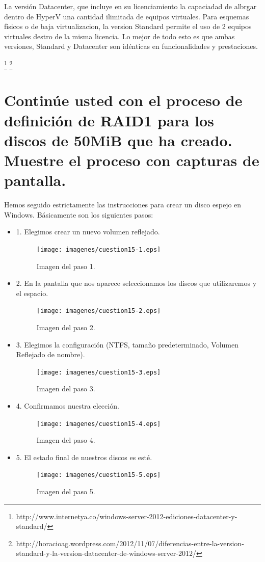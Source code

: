 La versión Datacenter, que incluye en su licenciamiento la capaciadad de albrgar dentro de HyperV una cantidad ilimitada de equipos virtuales. Para esquemas físicos o de baja virtualizacion, la version Standard permite el uso de 2 equipos virtuales destro de la misma licencia. Lo mejor de todo esto es que ambas versiones, Standard y Datacenter son idénticas en funcionalidades y prestaciones.


\footnote{ 
http://www.internetya.co/windows-server-2012-ediciones-datacenter-y-standard/}
\footnote{http://horacioag.wordpress.com/2012/11/07/diferencias-entre-la-version-standard-y-la-version-datacenter-de-windows-server-2012/}

\section{Continúe usted con el proceso de definición de RAID1 para los discos de 50MiB que ha creado. Muestre el proceso con capturas de pantalla.}
Hemos seguido estrictamente las instrucciones para crear un disco espejo en Windows. Básicamente son
los siguientes pasos:
\begin{itemize}
	\item 1. Elegimos crear un nuevo volumen reflejado.
\begin{figure}[H]
\begin{center}
\texttt{[image: imagenes/cuestion15-1.eps]}
\caption{Imagen del paso 1.}
\end{center}
\end{figure}
	\item 2. En la pantalla que nos aparece seleccionamos los discos que utilizaremos y el espacio.
	
\begin{figure}[H]
\begin{center}
\texttt{[image: imagenes/cuestion15-2.eps]}
\caption{Imagen del paso 2.}
\end{center}
\end{figure}
	\item 3. Elegimos la configuración (NTFS, tamaño predeterminado, Volumen Reflejado de
nombre).
\begin{figure}[H]
\begin{center}
\texttt{[image: imagenes/cuestion15-3.eps]}
\caption{Imagen del paso 3.}
\end{center}
\end{figure}
	\item 4. Confirmamos nuestra elección.
\begin{figure}[H]
\begin{center}
\texttt{[image: imagenes/cuestion15-4.eps]}
\caption{Imagen del paso 4.}
\end{center}
\end{figure}
	\item 5. El estado final de nuestros discos es esté.
\begin{figure}[H]
\begin{center}
\texttt{[image: imagenes/cuestion15-5.eps]}
\caption{Imagen del paso 5.}
\end{center}
\end{figure}
\end{itemize}

